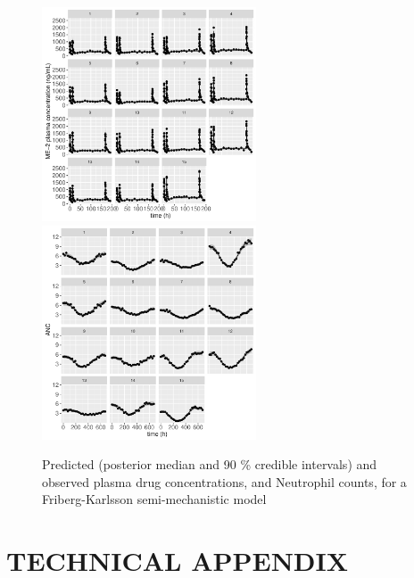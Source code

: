 \documentclass[11pt]{amsart}
\begin{document}
\begin{figure}[htbp]
\includegraphics[width=2.5in,trim=0in 0in 0 0in]{graphics/neutropenia_0.82/neutropeniaPopulationPlots010.pdf}
\includegraphics[width=2.5in,trim=0in 0in 0 0in]{graphics/neutropenia_0.82/neutropeniaPopulationPlots011.pdf}
\caption{{Predicted (posterior median and 90 \% credible intervals) and observed plasma drug concentrations, and Neutrophil counts, for a Friberg-Karlsson semi-mechanistic model}}
\label{FKPredictions}
\end{figure}
 
\clearpage

\appendix

\section*{TECHNICAL APPENDIX}
\end{document}
